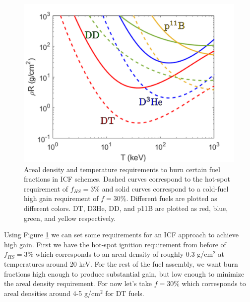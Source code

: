 	\begin{figure}[h!]
	\centering
	\includegraphics[scale=0.7]{Figures/fusionRequirements}
	\caption[ICF Fusion Requirements]{Areal density and temperature requirements to burn certain fuel fractions in ICF schemes. Dashed curves correspond to the hot-spot requirement of $f_{HS}=3\%$ and solid curves correspond to a cold-fuel high gain requirement of $f=30\%$. Different fuels are plotted as different colors. DT, D3He, DD, and p11B are plotted as red, blue, green, and yellow respectively.  }
	\label{fig:fusionRequirements}
\end{figure}

Using Figure \ref{fig:fusionRequirements} we can set some requirements for an ICF approach to achieve high gain. First we have the hot-spot ignition requirement from before of $f_{HS}=3\%$ which corresponds to an areal density of roughly 0.3 g/cm$^2$ at temperatures around 20 keV. For the rest of the fuel assembly, we want burn fractions high enough to produce substantial gain, but low enough to minimize the areal density requirement. For now let's take $f=30\%$ which corresponds to areal densities around 4-5 g/cm$^2$ for DT fuels. 

